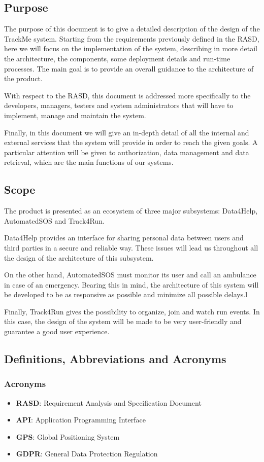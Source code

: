 \subsection{Purpose}
The purpose of this document is to give a detailed description of the design of the TrackMe system. Starting from the requirements previously defined in the RASD, here we will focus on the implementation of the system, describing in more detail the architecture, the components, some deployment details and run-time processes.
The main goal is to provide an overall guidance to the architecture of the product.

With respect to the RASD, this document is addressed more specifically to the developers, managers, testers and system administrators that will have to implement, manage and maintain the system.

Finally, in this document we will give an in-depth detail of all the internal and external services that the system will provide in order to reach the given goals. A particular attention will be given to authorization, data management and data retrieval, which are the main functions of our systems.
 
\subsection{Scope}

The product is presented as an ecosystem of three major subsystems: Data4Help, AutomatedSOS and Track4Run.

Data4Help provides an interface for sharing personal data between users and third parties in a secure and reliable way. These issues will lead us throughout all the design of the architecture of this subsystem.

On the other hand, AutomatedSOS must monitor its user and call an ambulance in case of an emergency. Bearing this in mind, the architecture of this system will be developed to be as responsive as possible and minimize all possible delays.l

Finally, Track4Run gives the possibility to organize, join and watch run events. In this case, the design of the system will be made to be very user-friendly and guarantee a good user experience.

\subsection{Definitions, Abbreviations and Acronyms}
\subsubsection{Acronyms}
\begin{itemize}
	\item \textbf{RASD}: Requirement Analysis and Specification Document
	\item \textbf{API}: Application Programming Interface
	\item \textbf{GPS}: Global Positioning System
	\item \textbf{GDPR}: General Data Protection Regulation
\end{itemize}

